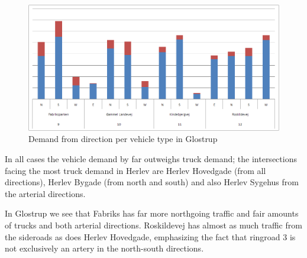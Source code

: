\begin{figure}[ht]
\begin{center}
\includegraphics[scale=0.30]{demand_from_direction_per_intersection_glostrup.png} 
\end{center}
\caption{Demand from direction per vehicle type in Glostrup}
\label{fig:insect_glostrup}
\end{figure}

In all cases the vehicle demand by far outweighs truck demand; the intersections facing the most truck demand in Herlev are Herlev Hovedgade (from all directions), Herlev Bygade (from north and south) and also Herlev Sygehus from the arterial directions. 

In Glostrup we see that Fabriks has far more northgoing traffic and fair amounts of trucks and both arterial directions. Roskildevej has almost as much traffic from the sideroads as does Herlev Hovedgade, emphasizing the fact that ringroad 3 is not exclusively an artery in the north-south directions.